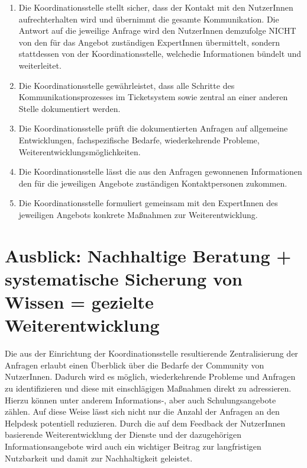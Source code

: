 \documentclass[a4paper,
fontsize=11pt,
oneside,
numbers=noperiodatend,
parskip=half-,
bibliography=totoc,
final
]{scrartcl}
\begin{document}
\begin{enumerate}
\def\labelenumi{\arabic{enumi}.}
\item
  Die Koordinationsstelle stellt sicher, dass der Kontakt mit den
  NutzerInnen aufrechterhalten wird und übernimmt die gesamte
  Kommunikation. Die Antwort auf die jeweilige Anfrage wird den
  NutzerInnen demzufolge NICHT von den für das Angebot zuständigen
  ExpertInnen übermittelt, sondern stattdessen von der
  Koordinationsstelle, welchedie Informationen bündelt und weiterleitet.
\item
  Die Koordinationsstelle gewährleistet, dass alle Schritte des
  Kommunikationsprozesses im Ticketsystem sowie zentral an einer anderen
  Stelle dokumentiert werden.
\item
  Die Koordinationsstelle prüft die dokumentierten Anfragen auf
  allgemeine Entwicklungen, fachspezifische Bedarfe, wiederkehrende
  Probleme, Weiterentwicklungsmöglichkeiten.
\item
  Die Koordinationsstelle lässt die aus den Anfragen gewonnenen
  Informationen den für die jeweiligen Angebote zuständigen
  Kontaktpersonen zukommen.
\item
  Die Koordinationsstelle formuliert gemeinsam mit den ExpertInnen des
  jeweiligen Angebots konkrete Maßnahmen zur Weiterentwicklung.
\end{enumerate}

\hypertarget{ausblick-nachhaltige-beratung-systematische-sicherung-von-wissen-gezielte-weiterentwicklung}{%
\section{Ausblick: Nachhaltige Beratung + systematische Sicherung
von Wissen = gezielte
Weiterentwicklung}\label{ausblick-nachhaltige-beratung-systematische-sicherung-von-wissen-gezielte-weiterentwicklung}}

Die aus der Einrichtung der Koordinationsstelle resultierende
Zentralisierung der Anfragen erlaubt einen Überblick über die Bedarfe
der Community von NutzerInnen. Dadurch wird es möglich, wiederkehrende
Probleme und Anfragen zu identifizieren und diese mit einschlägigen
Maßnahmen direkt zu adressieren. Hierzu können unter anderem
Informations-, aber auch Schulungsangebote zählen. Auf diese Weise lässt
sich nicht nur die Anzahl der Anfragen an den Helpdesk potentiell
reduzieren. Durch die auf dem Feedback der NutzerInnen basierende
Weiterentwicklung der Dienste und der dazugehörigen Informationsangebote
wird auch ein wichtiger Beitrag zur langfristigen Nutzbarkeit und damit
zur Nachhaltigkeit geleistet.
\end{document}
